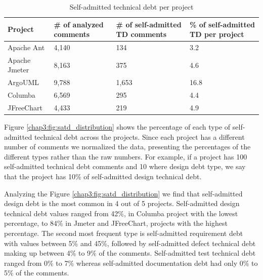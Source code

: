 \begin{table}[!hbt]
     \begin{center}
           \caption{Self-admitted technical debt per project}
           \label{tab:total_self_admitted_per_project}
           \begin{tabular}{l| p{0.75in} p{.7in} p{0.7in} }
           \toprule
           \textbf{Project}      & \textbf{\# of analyzed comments}     & \textbf{\# of self-admitted TD comments} & \textbf{\% of self-admitted TD per project} \\ \midrule 
             Apache Ant          & 4,140                          & 134                                & 3.2  \\                                   
             Apache Jmeter       & 8,163                          & 375                                & 4.6  \\                                   
             ArgoUML             & 9,788                          & 1,653                              & 16.8 \\                                   
             Columba             & 6,569                          & 295                                & 4.4 \\                                   
             JFreeChart          & 4,433                          & 219                                & 4.9  \\ \bottomrule
           \end{tabular}
     \end{center}
\end{table}

Figure \ref{chap3:fig:satd_distribution} shows the percentage of each type of self-admitted technical debt across the projects. Since each project has a different number of comments we normalized the data, presenting the percentages of the different types rather than the raw numbers. For example, if a project has 100 self-admitted technical debt comments and 10 where design debt type, we say that the project has 10\% of self-admitted design technical debt. 

Analyzing the Figure \ref{chap3:fig:satd_distribution} we find that self-admitted design debt is the most common in 4 out of 5 projects. Self-admitted design technical debt values ranged from 42\%, in Columba project with the lowest percentage, to 84\% in Jmeter and JFreeChart, projects with the highest percentage. The second most frequent type is self-admitted requirement debt with values between 5\% and 45\%, followed by self-admitted defect technical debt making up between 4\% to 9\% of the comments. Self-admitted test technical debt ranged from 0\% to 7\% whereas self-admitted documentation debt had only 0\% to 5\% of the comments.     

